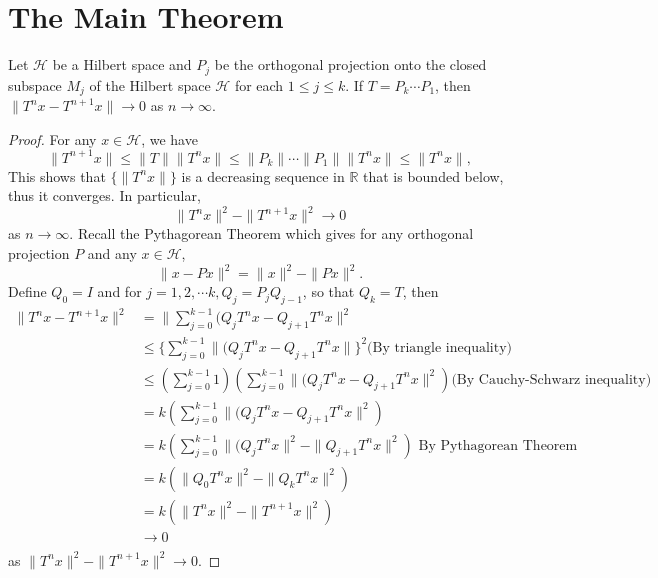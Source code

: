 \section{The Main Theorem}\label{chapt:Theorem1_Aili}
\begin{lemma}\label{1}
Let $\mathcal{H}$ be a Hilbert space and $P_j$ be the orthogonal projection onto the closed subspace $M_j$ of the Hilbert space $\mathcal{H}$ for each $1\leq j\leq k$. If $T=P_k\cdots P_1$, then $\|T^n x-T^{n+1}x\|\rightarrow 0$ as $n\rightarrow\infty$.
\begin{proof}
For any $x\in\mathcal{H}$, we have $$\|T^{n+1}x\|\leq \|T\|\|T^{n}x\|\leq \|P_k\|\cdots \|P_1\|\|T^n x\|\leq \|T^n x\|,$$ This shows that $\{\|T^n x\|\}$ is a decreasing sequence in $\mathbb{R}$ that is bounded below, thus it converges. In particular, $$\|T^n x\|^2-\|T^{n+1} x\|^2\rightarrow 0$$ as $n\rightarrow \infty$. Recall the Pythagorean Theorem which gives for any orthogonal projection $P$ and any $x\in\mathcal{H}$,$$\|x-Px\|^2=\|x\|^2-\|Px\|^2.$$
Define $Q_0=I$ and for $j=1,2,\cdots k, Q_j=P_jQ_{j-1}$, so that $Q_k=T$, then
\begin{align*}
\|T^n x-T^{n+1}x\|^2&=\|\sum_{j=0}^{k-1}(Q_jT^n x-Q_{j+1}T^n x\|^2\\
&\leq \{\sum_{j=0}^{k-1}\|(Q_jT^n x-Q_{j+1}T^n x\|\}^2 \mbox{(By triangle inequality)}\\
&\leq \left(\sum_{j=0}^{k-1}1 \right) \left( \sum_{j=0}^{k-1} \|(Q_j T^n x-Q_{j+1}T^n x\|^2 \right) \mbox {(By Cauchy-Schwarz inequality)}\\
&=k\left( \sum_{j=0}^{k-1} \|(Q_j T^n x-Q_{j+1}T^n x\|^2 \right)\\
&=k\left(\sum_{j=0}^{k-1} \|(Q_j T^n x\|^2-\|Q_{j+1}T^n x\|^2 \right)\mbox{ By Pythagorean Theorem}\\
&=k \left(\|Q_0 T^n x\|^2-\|Q_k T^n x\|^2 \right)\\
&=k \left(\|T^n x\|^2-\|T^{n+1} x\|^2 \right)\\
&\rightarrow 0\\ 
\end{align*}
 as $\|T^n x\|^2-\|T^{n+1} x\|^2\rightarrow 0.$
\end{proof}
\end{lemma}
